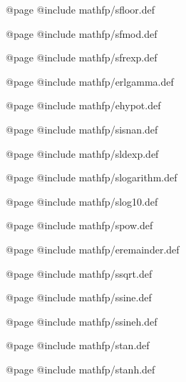 @page
@include mathfp/sfloor.def

@page
@include mathfp/sfmod.def

@page
@include mathfp/sfrexp.def

@page
@include mathfp/erlgamma.def

@page
@include mathfp/ehypot.def

@page
@include mathfp/sisnan.def

@page
@include mathfp/sldexp.def

@page
@include mathfp/slogarithm.def

@page
@include mathfp/slog10.def

@page
@include mathfp/spow.def

@page
@include mathfp/eremainder.def

@page
@include mathfp/ssqrt.def

@page
@include mathfp/ssine.def

@page
@include mathfp/ssineh.def

@page
@include mathfp/stan.def

@page
@include mathfp/stanh.def
